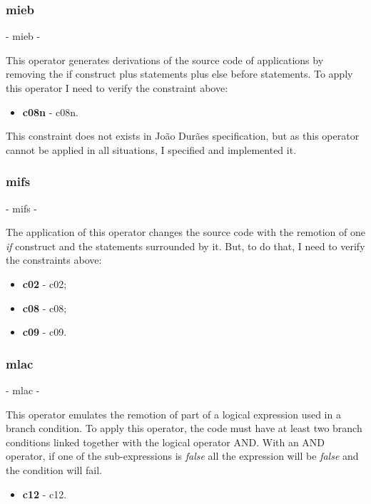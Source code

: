 	\subsubsection{\textbf{\acs{mieb}}} - \Acl{mieb} - 
	\hypertarget{mieb}{}

	This operator generates derivations of the source code of applications by removing the if construct plus statements plus else before statements. To apply this operator I need to verify the constraint above:
	\begin{itemize}
		\item \textbf{\acs{c08n}} - \Acl{c08n}.
	\end{itemize}

	This constraint does not exists in João Durães specification, but as this operator cannot be applied in all situations, I specified and implemented it.

	\subsubsection{\textbf{\acs{mifs}}} - \Acl{mifs} - 
	\hypertarget{mifs}{}

	The application of this operator changes the source code with the remotion of one \textit{if} construct and the statements surrounded by it.
	But, to do that, I need to verify the constraints above:
	\begin{itemize}
		\item \textbf{\acs{c02}} - \Acl{c02};
		\item \textbf{\acs{c08}} - \Acl{c08};
		\item \textbf{\acs{c09}} - \Acl{c09}.
	\end{itemize}

	\subsubsection{\textbf{\acs{mlac}}} - \Acl{mlac} - 
	\hypertarget{mlac}{}

	This operator emulates the remotion of part of a logical expression used in a branch condition. To apply this operator, the code must have at least two branch conditions linked together with the logical operator AND. With an AND operator, if one of the sub-expressions is \textit{false} all the expression will be \textit{false} and the condition will fail.
	\begin{itemize}
		\item \textbf{\acs{c12}} - \Acl{c12}.
	\end{itemize}

